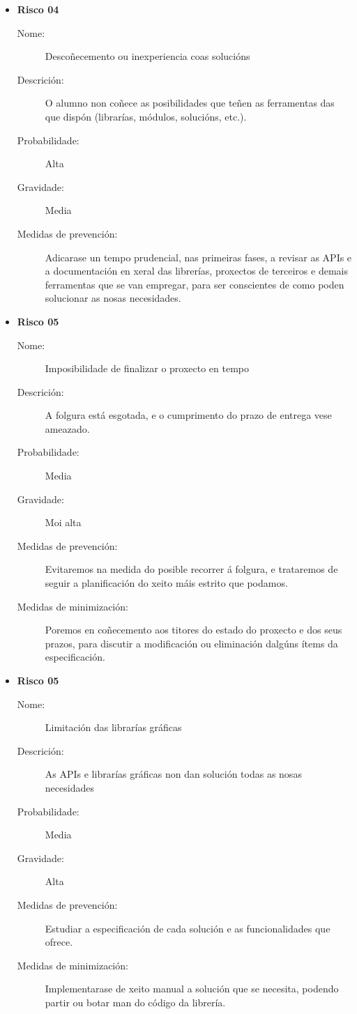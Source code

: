 \begin{itemize}
\item \textbf{Risco 04}
\begin{description}
\item[Nome:] Descoñecemento ou inexperiencia coas solucións
\item[Descrición:] O alumno non coñece as posibilidades que teñen as ferramentas das que dispón (librarías, módulos, solucións, etc.).
\item[Probabilidade:] Alta
\item[Gravidade:] Media
\item[Medidas de prevención:] Adicarase un tempo prudencial, nas primeiras fases, a revisar as APIs e a documentación en xeral das librerías, proxectos de terceiros e demais ferramentas que se van empregar, para ser conscientes de como poden solucionar as nosas necesidades.
\end{description}

\item \textbf{Risco 05}
\begin{description}
\item[Nome:] Imposibilidade de finalizar o proxecto en tempo
\item[Descrición:] A folgura está esgotada, e o cumprimento do prazo de entrega vese ameazado.
\item[Probabilidade:] Media
\item[Gravidade:] Moi alta
\item[Medidas de prevención:] Evitaremos na medida do posible recorrer á folgura, e trataremos de seguir a planificación do xeito máis estrito que podamos.
\item[Medidas de minimización:] Poremos en coñecemento aos titores do estado do proxecto e dos seus prazos, para discutir a modificación ou eliminación dalgúns ítems da especificación.
\end{description}

\item \textbf{Risco 05}
\begin{description}
\item[Nome:] Limitación das librarías gráficas
\item[Descrición:] As APIs e librarías gráficas non dan solución todas as nosas necesidades
\item[Probabilidade:] Media
\item[Gravidade:] Alta
\item[Medidas de prevención:] Estudiar a especificación de cada solución e as funcionalidades que ofrece.
\item[Medidas de minimización:] Implementarase de xeito manual a solución que se necesita, podendo partir ou botar man do código da librería.
\end{description}

\end{itemize}

